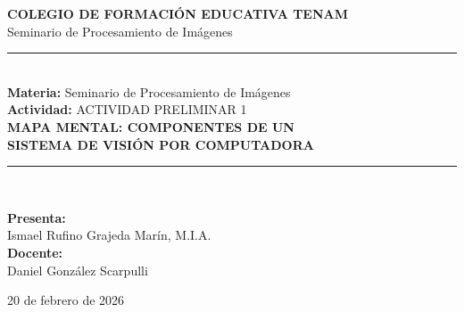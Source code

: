 \documentclass[12pt,letterpaper]{article}
\newcommand{\institucion}{COLEGIO DE FORMACIÓN EDUCATIVA TENAM}
\newcommand{\programa}{Seminario de Procesamiento de Imágenes}
\newcommand{\materia}{Seminario de Procesamiento de Imágenes}
\newcommand{\actividad}{ACTIVIDAD PRELIMINAR 1}
\newcommand{\tituloTrabajo}{MAPA MENTAL: COMPONENTES DE UN\\[0.2cm] SISTEMA DE VISIÓN POR COMPUTADORA}
\newcommand{\estudianteNombre}{Ismael Rufino Grajeda Marín}
\newcommand{\estudianteGrado}{M.I.A.}
\newcommand{\profesorNombre}{Daniel González Scarpulli}
\newcommand{\fechaEntrega}{20 de febrero de 2026}
\begin{document}
\begin{titlepage}
    \centering
    \vspace*{0.3cm}


    {\Large \textbf{\institucion}}\\[0.3cm]
    {\large \programa}\\[1cm]

    {\color{sectionColor}\rule{0.85\linewidth}{1.5pt}}\\[0.6cm]

    {\large \textbf{Materia:} \materia}\\[0.3cm]
    {\normalsize \textbf{Actividad:} \actividad}\\[1.2cm]

    {\LARGE\color{titleColor}\textbf{\tituloTrabajo}}\\[1.5cm]

    {\color{sectionColor}\rule{0.85\linewidth}{1pt}}\\[1cm]

    \begin{flushleft}
    \hspace{2.5cm}\begin{minipage}{0.75\textwidth}
        \textbf{Presenta:}\\
        \estudianteNombre, \estudianteGrado\\[0.6cm]

        \textbf{Docente:}\\
        \profesorNombre\\[0.6cm]
    \end{minipage}
    \end{flushleft}

    \vfill

    {\large \fechaEntrega}
    \vspace{0.5cm}
\end{titlepage}

\newpage
\setcounter{page}{1}

\end{document}
